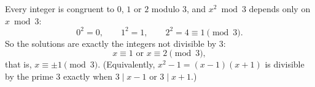 Every integer is congruent to $0$, $1$ or $2$ modulo $3$, and $x^2\bmod 3$ depends only on $x\bmod3$:
\[
0^2=0,\qquad 1^2=1,\qquad 2^2=4\equiv1\pmod3 .
\]
So the solutions are exactly the integers not divisible by $3$:
\[
\boxed{x\equiv1\text{ or }x\equiv2\pmod3},
\]
that is, $x\equiv\pm1\pmod3$. (Equivalently, $x^2-1=(x-1)(x+1)$ is divisible by the prime $3$ exactly when $3\mid x-1$ or $3\mid x+1$.)
